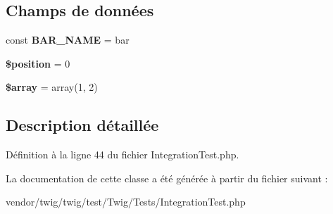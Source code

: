 \subsection*{Champs de données}
\begin{DoxyCompactItemize}
\item 
const {\bfseries B\+A\+R\+\_\+\+N\+A\+ME} = \textquotesingle{}bar\textquotesingle{}\hypertarget{class_twig_test_foo_a8959c8dea8146ea4064dae12c987cf91}{}\label{class_twig_test_foo_a8959c8dea8146ea4064dae12c987cf91}

\item 
{\bfseries \$position} = 0\hypertarget{class_twig_test_foo_a6e88dcb746884d18f6c89eb9b9c14a42}{}\label{class_twig_test_foo_a6e88dcb746884d18f6c89eb9b9c14a42}

\item 
{\bfseries \$array} = array(1, 2)\hypertarget{class_twig_test_foo_ac1361b8d873c1f927b21b809f99e5752}{}\label{class_twig_test_foo_ac1361b8d873c1f927b21b809f99e5752}

\end{DoxyCompactItemize}


\subsection{Description détaillée}


Définition à la ligne 44 du fichier Integration\+Test.\+php.



La documentation de cette classe a été générée à partir du fichier suivant \+:\begin{DoxyCompactItemize}
\item 
vendor/twig/twig/test/\+Twig/\+Tests/Integration\+Test.\+php\end{DoxyCompactItemize}
